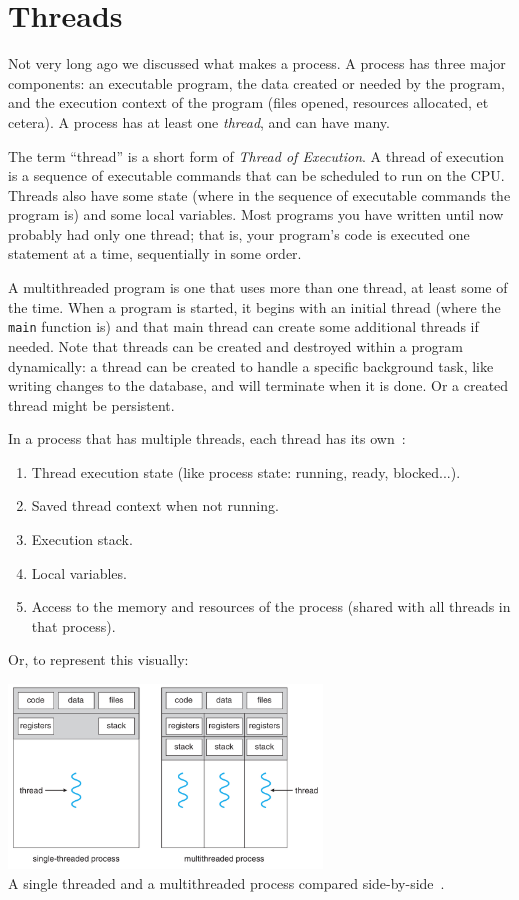 \documentclass[a4paper]{report}
\begin{document}

\section*{Threads}

Not very long ago we discussed what makes a process. A process has three major components: an executable program, the data created or needed by the program, and the execution context of the program (files opened, resources allocated, et cetera). A process has at least one \textit{thread}, and can have many.

The term ``thread'' is a short form of \textit{Thread of Execution}. A thread of execution is a sequence of executable commands that can be scheduled to run on the CPU. Threads also have some state (where in the sequence of executable commands the program is) and some local variables. Most programs you have written until now probably had only one thread; that is, your program's code is executed one statement at a time, sequentially in some order.

A multithreaded program is one that uses more than one thread, at least some of the time. When a program is started, it begins with an initial thread (where the \texttt{main} function is) and that main thread can create some additional threads if needed. Note that threads can be created and destroyed within a program dynamically: a thread can be created to handle a specific background task, like writing changes to the database, and will terminate when it is done. Or a created thread might be persistent.

In a process that has multiple threads, each thread has its own~\cite{osi}:
\begin{enumerate}
	\item Thread execution state (like process state: running, ready, blocked...).
	\item Saved thread context when not running.
	\item Execution stack.
	\item Local variables.
	\item Access to the memory and resources of the process (shared with all threads in that process).
\end{enumerate}

Or, to represent this visually:

\begin{center}
	\includegraphics[width=0.625\textwidth]{images/mthread2.png}\\
	A single threaded and a multithreaded process compared side-by-side~\cite{osc}.
\end{center}
\end{document}
